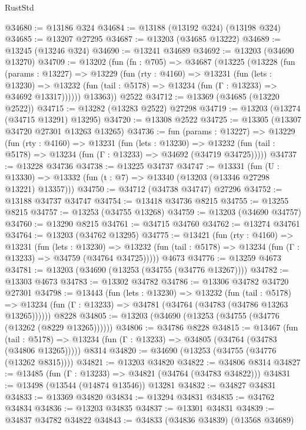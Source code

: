 \begin{lexlean}{RustStd}
\begin{coremodule}
@34680 := @13186 @324
@34684 := @13188 (@13192 @324) (@13198 @324)
@34685 := @13207 @27295
@34687 := @13203 (@34685 @13222)
@34689 := @13245 (@13246 @324)
@34690 := @13241 @34689
@34692 := @13203 (@34690 @13270)
@34709 := @13202
    (fun (fn : @705) =>
    @34687
      (@13225
        (@13228
          (fun (params : @13227) =>
          @13229
            (fun (rty : @4160) =>
            @13231
              (fun (lets : @13230) =>
              @13232 (fun (tail : @5178) => @13234 (fun (Γ : @13233) => @34692 @13317))))))
        @13363))
    @2522
@34712 := @13369 (@34685 (@13220 @2522))
@34715 := @13282 (@13283 @2522) @27298
@34719 := @13203 (@13274 (@34715 @13291) @13295)
@34720 := @13308 @2522
@34725 := @13305 (@13307 @34720 @27301 @13263 @13265)
@34736 := fun (params : @13227) =>
  @13229
    (fun (rty : @4160) =>
    @13231
      (fun (lets : @13230) =>
      @13232 (fun (tail : @5178) => @13234 (fun (Γ : @13233) => @34692 (@34719 @34725)))))
@34737 := @13228 @34736
@34738 := @13225 @34737
@34747 := @13331
    (fun (U : @13330) => @13332 (fun (t : @7) => @13340 (@13203 (@13346 @27298 @13221) @13357)))
@34750 := @34712 (@34738 @34747) @27296
@34752 := @13188 @34737 @34747
@34754 := @13418 @34736 @8215
@34755 := @13255 @8215
@34757 := @13253 (@34755 @13268)
@34759 := @13203 (@34690 @34757)
@34760 := @13290 @8215
@34761 := @34715 @34760
@34762 := @13274 @34761
@34764 := @13203 (@34762 @13295)
@34775 := @13421
    (fun (rty : @4160) =>
    @13231
      (fun (lets : @13230) =>
      @13232 (fun (tail : @5178) => @13234 (fun (Γ : @13233) => @34759 (@34764 @34725)))))
    @4673
@34776 := @13259 @4673
@34781 := @13203 (@34690 (@13253 (@34755 (@34776 @13267))))
@34782 := @13303 @4673
@34783 := @13302 @34782
@34786 := @13306 @34782 @34720 @27301
@34798 := @13443
    (fun (lets : @13230) =>
    @13232
      (fun (tail : @5178) =>
      @13234 (fun (Γ : @13233) => @34781 (@34764 (@34783 (@34786 @13263 @13265))))))
    @8228
@34805 := @13203 (@34690 (@13253 (@34755 (@34776 (@13262 (@8229 @13265))))))
@34806 := @34786 @8228
@34815 := @13467
    (fun (tail : @5178) => @13234 (fun (Γ : @13233) => @34805 (@34764 (@34783 (@34806 @13265)))))
    @8314
@34820 := @34690 (@13253 (@34755 (@34776 (@13262 @8315))))
@34821 := @13203 @34820
@34822 := @34806 @8314
@34827 := @13485 (fun (Γ : @13233) => @34821 (@34764 (@34783 @34822)))
@34831 := @13498 (@13544 (@14874 @13546)) @13281
@34832 := @34827 @34831
@34833 := @13369 @34820
@34834 := @13294 @34831
@34835 := @34762 @34834
@34836 := @13203 @34835
@34837 := @13301 @34831
@34839 := @34837 @34782 @34822
@34843 := @34833 (@34836 @34839) (@13568 @34689)

\end{coremodule}
\end{lexlean}
